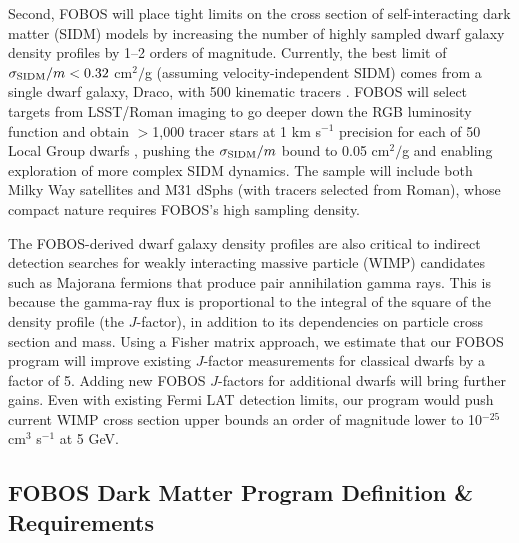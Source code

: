 \documentclass[11pt,a4paper,twoside,onecolumn,openany,final,oldfontcommands]{memoir}
\begin{document}
Second, FOBOS will place tight limits on the cross section of self-interacting dark matter (SIDM) models by increasing the number of highly sampled dwarf galaxy density profiles by 1--2 orders of magnitude.  Currently, the best limit of $\sigma_{\rm SIDM}/m < 0.32$ cm$^2/$g (assuming velocity-independent SIDM) comes from a single dwarf galaxy, Draco, with 500 kinematic tracers \citep{read18}.  FOBOS will select targets from LSST/Roman imaging to go deeper down the RGB luminosity function and obtain $>$1,000 tracer stars at 1 km s$^{-1}$ precision for each of 50 Local Group dwarfs \citep[see][]{drlica-wagner19}, pushing the $\sigma_{\rm SIDM}/m$ bound to 0.05 cm$^2/$g and enabling exploration of more complex SIDM dynamics.  The sample will include both Milky Way satellites and M31 dSphs (with tracers selected from Roman), whose compact nature requires FOBOS's high sampling density.   

The FOBOS-derived dwarf galaxy density profiles are also critical to indirect detection searches for weakly interacting massive particle (WIMP) candidates such as Majorana fermions that produce pair annihilation gamma rays.  This is because the gamma-ray flux is proportional to the integral of the square of the density profile (the $J$-factor), in addition to its dependencies on particle cross section and mass.  Using a Fisher matrix approach, we estimate that our FOBOS program will improve existing $J$-factor measurements for classical dwarfs by a factor of 5.  Adding new FOBOS $J$-factors for additional dwarfs will bring further gains.  Even with existing Fermi LAT detection limits, our program would push current WIMP cross section upper bounds an order of magnitude lower to 10$^{-25}$ cm$^3$ s$^{-1}$ at 5 GeV.



\subsection{FOBOS Dark Matter Program Definition \& Requirements}
\end{document}
